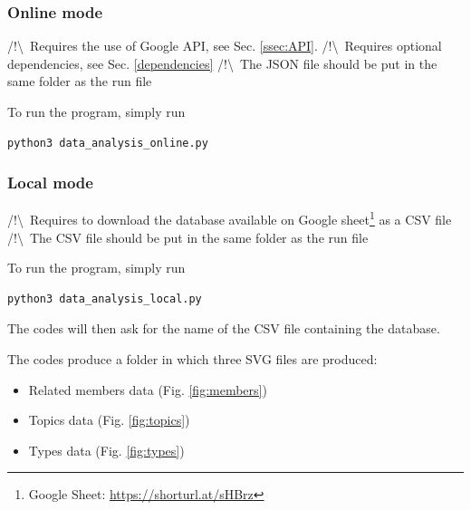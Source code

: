 \begin{multicols}{2}
    \raggedcolumns
    \subsubsection*{Online mode}
        
        /!\textbackslash \ Requires the use of Google API, see Sec. \ref{ssec:API}.\newline
        /!\textbackslash \ Requires optional dependencies, see Sec. \ref{dependencies}\newline
        /!\textbackslash \ The JSON file should be put in the same folder as the run file
            
        To run the program, simply run
        \begin{lstlisting}[language=Python]
        python3 data_analysis_online.py\end{lstlisting}
        \columnbreak
    \subsubsection*{Local mode}
        
        /!\textbackslash \ Requires to download the database available on Google sheet\footnote{Google Sheet: \href{https://docs.google.com/spreadsheets/d/1x_SdxdlHwG8chH77WqrTAAgijY2XBY3nPIi2p3TKqzs/edit?gid=1297224389\#gid=1297224389}{https://shorturl.at/sHBrz}} as a CSV file\newline
        /!\textbackslash \ The CSV file should be put in the same folder as the run file
        
        To run the program, simply run
        \begin{lstlisting}[language=Python]
        python3 data_analysis_local.py\end{lstlisting}
        
        The codes will then ask for the name of the CSV file containing the database.
\end{multicols}

The codes produce a  folder in which three SVG files are produced: 
\begin{itemize}
    \item Related members data (Fig. \ref{fig:members})
    \item Topics data (Fig. \ref{fig:topics})
    \item Types data (Fig. \ref{fig:types})
\end{itemize}